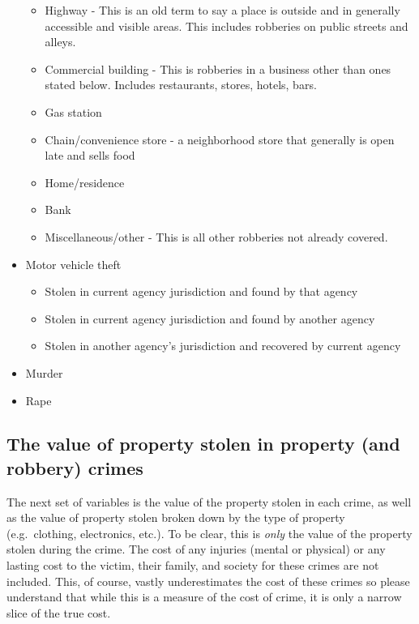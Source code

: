 \documentclass[
  12pt,
  openany]{book}
\providecommand{\tightlist}{%
  \setlength{\itemsep}{0pt}\setlength{\parskip}{0pt}}
\begin{document}
\begin{itemize}
  \begin{itemize}
  \tightlist
  \item
    Highway - This is an old term to say a place is outside and in generally accessible and visible areas. This includes robberies on public streets and alleys.
  \item
    Commercial building - This is robberies in a business other than ones stated below. Includes restaurants, stores, hotels, bars.
  \item
    Gas station
  \item
    Chain/convenience store - a neighborhood store that generally is open late and sells food
  \item
    Home/residence
  \item
    Bank
  \item
    Miscellaneous/other - This is all other robberies not already covered.
  \end{itemize}
\item
  Motor vehicle theft

  \begin{itemize}
  \tightlist
  \item
    Stolen in current agency jurisdiction and found by that agency
  \item
    Stolen in current agency jurisdiction and found by another agency
  \item
    Stolen in another agency's jurisdiction and recovered by current agency
  \end{itemize}
\item
  Murder
\item
  Rape
\end{itemize}

\hypertarget{the-value-of-property-stolen-in-property-and-robbery-crimes}{%
\subsection{The value of property stolen in property (and robbery) crimes}\label{the-value-of-property-stolen-in-property-and-robbery-crimes}}

The next set of variables is the value of the property stolen in each crime, as well as the value of property stolen broken down by the type of property (e.g.~clothing, electronics, etc.). To be clear, this is \emph{only} the value of the property stolen during the crime. The cost of any injuries (mental or physical) or any lasting cost to the victim, their family, and society for these crimes are not included. This, of course, vastly underestimates the cost of these crimes so please understand that while this is a measure of the cost of crime, it is only a narrow slice of the true cost.
\end{document}
